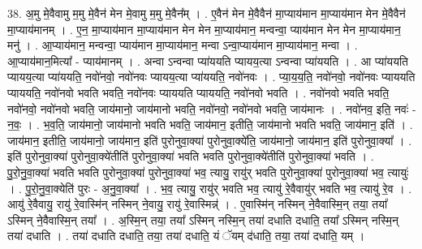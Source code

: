 \documentclass[17pt]{extarticle}
\begin{document}
38. अ॒मु मे॒वैवामु म॒मु मे॒वैन॑ मेन मे॒वामु म॒मु मे॒वैन᳚म् । . ए॒वैन॑ मेन मे॒वैवैन॑ मा॒प्याय॑मान मा॒प्याय॑मान मेन मे॒वैवैन॑ मा॒प्याय॑मानम् । . ए॒न॒ मा॒प्याय॑मान मा॒प्याय॑मान मेन मेन मा॒प्याय॑मान॒ मन्वन्वा॒ प्याय॑मान मेन मेन मा॒प्याय॑मान॒ मनु॑ । . आ॒प्याय॑मान॒ मन्वन्वा॒ प्याय॑मान मा॒प्याय॑मान॒ मन्वा ऽन्वा॒प्याय॑मान मा॒प्याय॑मान॒ मन्वा । . आ॒प्याय॑मान॒मित्या᳚ - प्याय॑मानम् । . अन्वा ऽन्वन्वा प्या॑ययति प्यायय॒त्या ऽन्वन्वा प्या॑ययति । . आ प्या॑ययति प्यायय॒त्या प्या॑ययति॒ नवो॑नवो॒ नवो॑नवः प्यायय॒त्या प्या॑ययति॒ नवो॑नवः । . प्या॒य॒य॒ति॒ नवो॑नवो॒ नवो॑नवः प्याययति प्याययति॒ नवो॑नवो भवति भवति॒ नवो॑नवः प्याययति प्याययति॒ नवो॑नवो भवति । . नवो॑नवो भवति भवति॒ नवो॑नवो॒ नवो॑नवो भवति॒ जाय॑मानो॒ जाय॑मानो भवति॒ नवो॑नवो॒ नवो॑नवो भवति॒ जाय॑मानः । . नवो॑नव॒ इति॒ नवः॑ - न॒वः॒ । . भ॒व॒ति॒ जाय॑मानो॒ जाय॑मानो भवति भवति॒ जाय॑मान॒ इतीति॒ जाय॑मानो भवति भवति॒ जाय॑मान॒ इति॑ । . जाय॑मान॒ इतीति॒ जाय॑मानो॒ जाय॑मान॒ इति॑ पुरोनुवा॒क्या॑ पुरोनुवा॒क्ये॑ति॒ जाय॑मानो॒ जाय॑मान॒ इति॑ पुरोनुवा॒क्या᳚ । . इति॑ पुरोनुवा॒क्या॑ पुरोनुवा॒क्ये॑तीति॑ पुरोनुवा॒क्या॑ भवति भवति पुरोनुवा॒क्ये॑तीति॑ पुरोनुवा॒क्या॑ भवति । . पु॒रो॒नु॒वा॒क्या॑ भवति भवति पुरोनुवा॒क्या॑ पुरोनुवा॒क्या॑ भव॒ त्यायु॒ रायु॑र् भवति पुरोनुवा॒क्या॑ पुरोनुवा॒क्या॑ भव॒ त्यायुः॑ । . पु॒रो॒नु॒वा॒क्येति॑ पुरः - अ॒नु॒वा॒क्या᳚ । . भ॒व॒ त्यायु॒ रायु॑र् भवति भव॒ त्यायु॑ रे॒वैवायु॑र् भवति भव॒ त्यायु॑ रे॒व । . आयु॑ रे॒वैवायु॒ रायु॑ रे॒वास्मि॑न् नस्मिन् ने॒वायु॒ रायु॑ रे॒वास्मिन्न्॑ । . ए॒वास्मि॑न् नस्मिन् ने॒वैवास्मि॒न् तया॒ तया᳚ ऽस्मिन् ने॒वैवास्मि॒न् तया᳚ । . अ॒स्मि॒न् तया॒ तया᳚ ऽस्मिन् नस्मि॒न् तया॑ दधाति दधाति॒ तया᳚ ऽस्मिन् नस्मि॒न् तया॑ दधाति । . तया॑ दधाति दधाति॒ तया॒ तया॑ दधाति॒ यं ॅयम् द॑धाति॒ तया॒ तया॑ दधाति॒ यम् । \newline
\end{document}
